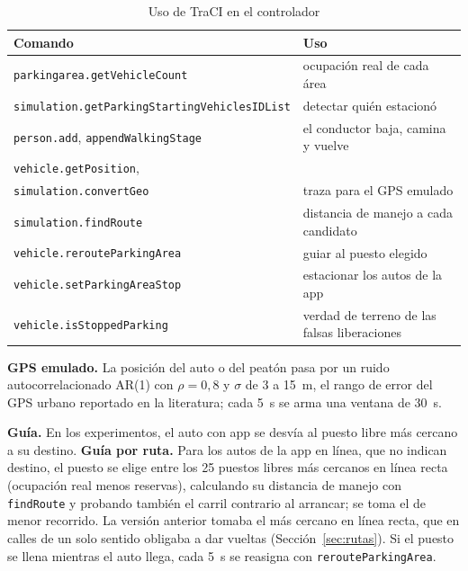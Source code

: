 \documentclass[conference]{IEEEtran}
\newcommand{\cod}[1]{\texttt{#1}}
\begin{document}
\begin{table}[t]
\centering
\caption{Uso de TraCI en el controlador}
\label{tab:traci}
\scriptsize
\begin{tabularx}{\columnwidth}{@{}>{\raggedright\arraybackslash}p{4.3cm}>{\raggedright\arraybackslash}X@{}}
\toprule
Comando & Uso \\
\midrule
\cod{parkingarea.getVehicleCount} & ocupación real de cada área \\
\cod{simulation.getParking\-Starting\-VehiclesIDList} & detectar quién estacionó \\
\cod{person.add}, \cod{appendWalkingStage} & el conductor baja, camina y vuelve \\
\cod{vehicle.getPosition},\\ \cod{simulation.convertGeo} & traza para el GPS emulado \\
\cod{simulation.findRoute} & distancia de manejo a cada candidato \\
\cod{vehicle.rerouteParkingArea} & guiar al puesto elegido \\
\cod{vehicle.setParkingAreaStop} & estacionar los autos de la app \\
\cod{vehicle.isStoppedParking} & verdad de terreno de las falsas liberaciones \\
\bottomrule
\end{tabularx}
\end{table}

\textbf{GPS emulado.} La posición del auto o del peatón pasa por un ruido autocorrelacionado AR(1) con $\rho=0{,}8$ y $\sigma$ de 3 a 15~m, el rango de error del GPS urbano reportado en la literatura; cada 5~s se arma una ventana de 30~s.

\textbf{Guía.} En los experimentos, el auto con app se desvía al puesto libre más cercano a su destino. \textbf{Guía por ruta.} Para los autos de la app en línea, que no indican destino, el puesto se elige entre los 25 puestos libres más cercanos en línea recta (ocupación real menos reservas), calculando su distancia de manejo con \cod{findRoute} y probando también el carril contrario al arrancar; se toma el de menor recorrido. La versión anterior tomaba el más cercano en línea recta, que en calles de un solo sentido obligaba a dar vueltas (Sección~\ref{sec:rutas}). Si el puesto se llena mientras el auto llega, cada 5~s se reasigna con \cod{rerouteParkingArea}.
\end{document}
